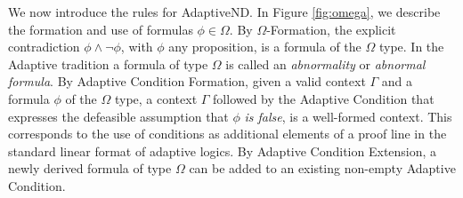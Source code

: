 \documentclass[]{article}
\begin{document}



We now introduce the rules for {\sf AdaptiveND}. In Figure \ref{fig:omega}, we describe the formation and use of formulas $\phi \in \Omega$. By $\Omega${\sf-Formation}, the explicit contradiction $\phi \wedge \neg \phi$, with $\phi$ any proposition, is a formula of the $\Omega$ type. In the Adaptive tradition a formula of type $\Omega$ is called an \textit{abnormality} or \textit{abnormal formula}. By {\sf Adaptive Condition Formation}, given a valid context $\Gamma$ and a formula $\phi$ of the $\Omega$ type, a context $\Gamma$ followed by the Adaptive Condition that expresses the defeasible assumption that $\phi$ \textit{is false}, is a well-formed context. This corresponds to the use of conditions as additional elements of a proof line in the standard linear format of adaptive logics. By {\sf Adaptive Condition Extension}, a newly derived formula of type $\Omega$ can be added to an existing non-empty Adaptive Condition.
\end{document}
